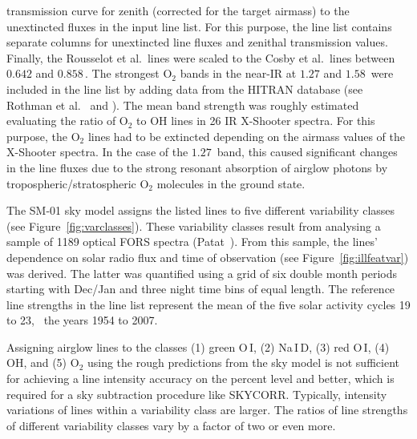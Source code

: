transmission curve for zenith (corrected for the target airmass) to the
unextincted fluxes in the input line list. For this purpose, the line list
contains separate columns for unextincted line fluxes and zenithal transmission
values. Finally, the Rousselot et al.~lines were scaled to the Cosby et
al.~lines between $0.642$ and $0.858$\,\mum{}. The strongest O$_2$ bands in the
near-IR at $1.27$ and $1.58$\,\mum{} were included in the line list by adding
data from the HITRAN database (see Rothman et al.~\cite{ROT09} and
\cite{HITRAN}). The mean band strength was roughly estimated evaluating the
ratio of O$_2$ to OH lines in 26 IR X-Shooter spectra. For this purpose, the
O$_2$ lines had to be extincted depending on the airmass values of the
X-Shooter spectra. In the case of the $1.27$\,\mum{} band, this caused
significant changes in the line fluxes due to the strong resonant absorption of
airglow photons by tropospheric/stratospheric O$_2$ molecules in the ground
state.

The SM-01 sky model assigns the listed lines to five different variability
classes (see Figure~\ref{fig:varclasses}). These variability classes result
from analysing a sample of 1189 optical FORS spectra (Patat~\cite{PAT08}). From
this sample, the lines' dependence on solar radio flux and time of observation
(see Figure~\ref{fig:illfeatvar}) was derived. The latter was quantified using
a grid of six double month periods starting with Dec/Jan and three night time
bins of equal length. The reference line strengths in the line list represent
the mean of the five solar activity cycles 19 to 23, \ie\ the years 1954 to
2007.

Assigning airglow lines to the classes (1) green O\,I, (2) Na\,I\,D,
(3) red O\,I, (4) OH, and (5) O$_2$ using the rough predictions from the sky
model is not sufficient for achieving a line intensity accuracy on the percent
level and better, which is required for a sky subtraction procedure like
SKYCORR. Typically, intensity variations of lines within a variability class
are larger. The ratios of line strengths of different variability classes vary
by a factor of two or even more.

